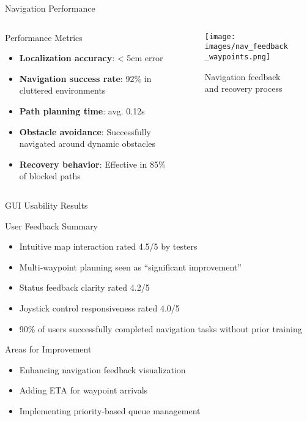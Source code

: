 \documentclass[aspectratio=169]{beamer}
\newcommand{\reducefontsize}{\fontsize{7}{9}\selectfont}
\begin{document}
\begin{frame}{Navigation Performance}
	\begin{columns}
		\begin{column}{0.5\textwidth}
			\begin{block}{Performance Metrics}
        {\reducefontsize%
				\begin{itemize}
					\item \textbf{Localization accuracy}: < 5cm error
					\item \textbf{Navigation success rate}: 92\% in cluttered environments
					\item \textbf{Path planning time}: avg. 0.12s
					\item \textbf{Obstacle avoidance}: Successfully navigated around dynamic obstacles
					\item \textbf{Recovery behavior}: Effective in 85\% of blocked paths
				\end{itemize}
        }
			\end{block}
		\end{column}
		\begin{column}{0.2\textwidth}
			\begin{figure}
				\texttt{[image: images/nav\_feedback\_waypoints.png]}
				\caption{Navigation feedback and recovery process}
			\end{figure}
		\end{column}
	\end{columns}
\end{frame}

\begin{frame}{GUI Usability Results}
	\begin{exampleblock}{User Feedback Summary}
		\begin{itemize}
			\item Intuitive map interaction rated 4.5/5 by testers
			\item Multi-waypoint planning seen as ``significant improvement''
			\item Status feedback clarity rated 4.2/5
			\item Joystick control responsiveness rated 4.0/5
			\item 90\% of users successfully completed navigation tasks without prior training
		\end{itemize}
	\end{exampleblock}

	\begin{alertblock}{Areas for Improvement}
		\begin{itemize}
			\item Enhancing navigation feedback visualization
			\item Adding ETA for waypoint arrivals
			\item Implementing priority-based queue management
		\end{itemize}
	\end{alertblock}
\end{frame}
\end{document}
